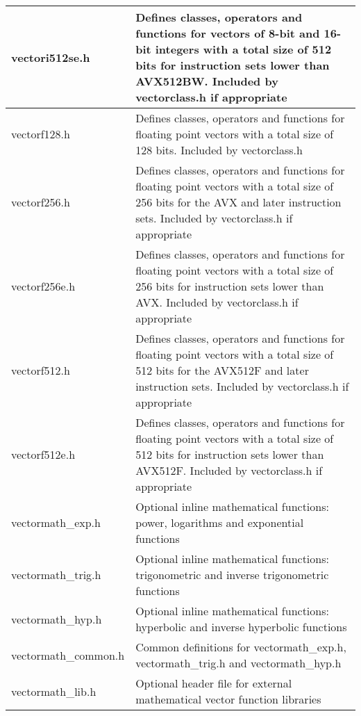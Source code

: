 \documentclass[vcl_manual.tex]{subfiles}
\begin{document}
\begin{longtable}[l]{|p{40mm}|p{100mm}|}
vectori512se.h & Defines classes, operators and functions for vectors of 8-bit and 16-bit integers  with a total size of 512 bits for instruction sets lower than
AVX512BW. Included by vectorclass.h if appropriate \\ \hline

vectorf128.h & Defines classes, operators and functions for floating point vectors with a total size of 128 bits. Included by vectorclass.h \\ \hline

vectorf256.h & Defines classes, operators and functions for floating point vectors with a total size of 256 bits for the AVX and later instruction sets. Included by vectorclass.h if appropriate \\ \hline

vectorf256e.h & Defines classes, operators and functions for floating point vectors with a total size of 256 bits for instruction sets lower than AVX. Included by vectorclass.h if appropriate \\ \hline

vectorf512.h & Defines classes, operators and functions for floating point vectors with a total size of 512 bits for the AVX512F and later instruction sets. Included by vectorclass.h if appropriate \\ \hline

vectorf512e.h & Defines classes, operators and functions for floating point vectors with a total size of 512 bits for instruction sets lower than AVX512F. Included by vectorclass.h if appropriate \\ \hline

vectormath\_exp.h & Optional inline mathematical functions: power, logarithms and exponential functions \\ \hline

vectormath\_trig.h & Optional inline mathematical functions: trigonometric and inverse trigonometric functions \\ \hline

vectormath\_hyp.h & Optional inline mathematical functions: hyperbolic and inverse hyperbolic functions \\ \hline

vectormath\_common.h & Common definitions for vectormath\_exp.h, vectormath\_trig.h and vectormath\_hyp.h \\ \hline

vectormath\_lib.h & Optional header file for external mathematical vector function libraries \\ \hline


\end{longtable}
\end{document}
